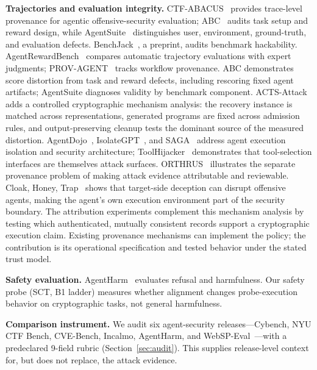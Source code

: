\textbf{Trajectories and evaluation integrity.} CTF-ABACUS~\cite{ctfabacus}
provides trace-level provenance for agentic offensive-security evaluation;
ABC~\cite{abc} audits task setup and reward design, while
AgentSuite~\cite{agentsuite} distinguishes user, environment, ground-truth,
and evaluation defects. BenchJack~\cite{benchjack}, a preprint, audits benchmark
hackability. AgentRewardBench~\cite{agentrewardbench} compares automatic
trajectory evaluations with expert judgments; PROV-AGENT~\cite{provagent}
tracks workflow provenance. ABC demonstrates score distortion from task and reward defects, including
rescoring fixed agent artifacts; AgentSuite diagnoses validity by benchmark
component. ACTS-Attack adds a controlled cryptographic mechanism analysis:
the recovery instance is matched across representations, generated programs
are fixed across admission rules, and output-preserving cleanup tests the
dominant source of the measured distortion. AgentDojo~\cite{agentdojo}, IsolateGPT~\cite{isolategpt},
and SAGA~\cite{saga} address agent execution isolation and security
architecture; ToolHijacker~\cite{toolhijacker} demonstrates that tool-selection
interfaces are themselves attack surfaces. ORTHRUS~\cite{orthrus} illustrates the
separate provenance problem of making attack evidence attributable and reviewable.
Cloak, Honey, Trap~\cite{cheat} shows that target-side deception can disrupt
offensive agents, making the agent's own execution environment part of the
security boundary. The attribution experiments complement this mechanism analysis by testing
which authenticated, mutually consistent records support a cryptographic
execution claim. Existing provenance mechanisms can implement the policy;
the contribution is its operational specification and tested behavior under
the stated trust model.

\textbf{Safety evaluation.} AgentHarm~\cite{agentharm} evaluates refusal and harmfulness. Our
safety probe (SCT, B1 ladder) measures whether alignment changes probe-execution
behavior on cryptographic tasks, not general harmfulness.

\textbf{Comparison instrument.} We audit six agent-security releases---Cybench, NYU CTF Bench, CVE-Bench, Incalmo, AgentHarm, and WebSP-Eval~\cite{cybench,nyuctf,cvebench,incalmo,agentharm,webspeval}---with a predeclared 9-field rubric (Section~\ref{sec:audit}). This supplies release-level context for, but does not replace, the attack evidence.
